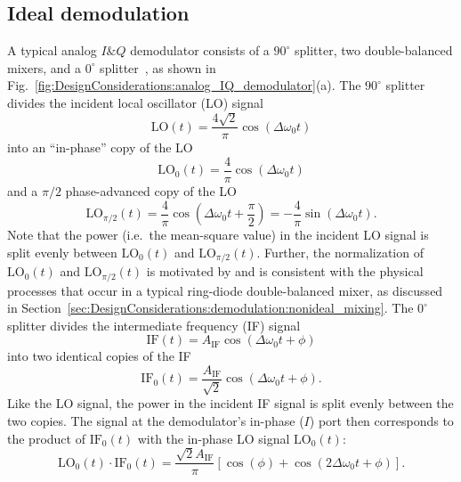 \subsection{Ideal demodulation}
\label{sec:DesignConsiderations:demodulation:ideal}
A typical analog $I\&Q$ demodulator consists of
a $90^{\circ}$ splitter,
two double-balanced mixers, and
a $0^{\circ}$ splitter~\cite{minicircuits_modulators}, as shown in
Fig.~\ref{fig:DesignConsiderations:analog_IQ_demodulator}(a).
The $90^{\circ}$ splitter divides the incident local oscillator (LO) signal
\begin{equation}
  \text{LO}(t) = \frac{4 \sqrt{2}}{\pi} \cos(\Delta\omega_0 t)
\end{equation}
into an ``in-phase'' copy of the LO
\begin{equation}
  \text{LO}_0(t)
  =
  \frac{4}{\pi} \cos(\Delta\omega_0 t)
\end{equation}
and a $\pi / 2$ phase-advanced copy of the LO
\begin{equation}
  \text{LO}_{\pi / 2}(t)
  =
  \frac{4}{\pi} \cos\left( \Delta\omega_0 t + \frac{\pi}{2} \right)
  =
  -\frac{4}{\pi} \sin(\Delta\omega_0 t).
\end{equation}
Note that the power (i.e.\ the mean-square value) in the incident LO signal
is split evenly between $\text{LO}_0(t)$ and $\text{LO}_{\pi / 2}(t)$.
Further, the normalization of $\text{LO}_0(t)$ and $\text{LO}_{\pi / 2}(t)$
is motivated by and is consistent with the physical processes
that occur in a typical ring-diode double-balanced mixer, as discussed in
Section~\ref{sec:DesignConsiderations:demodulation:nonideal_mixing}.
The $0^{\circ}$ splitter divides the intermediate frequency (IF) signal
\begin{equation}
  \text{IF}(t) = A_{\text{IF}} \cos(\Delta\omega_0 t + \phi)
  \label{eq:DesignConsiderations:IF_perfect_sinusoid}
\end{equation}
into two identical copies of the IF
\begin{equation}
  \text{IF}_0(t)
  =
  \frac{A_{\text{IF}}}{\sqrt{2}} \cos(\Delta\omega_0 t + \phi).
  \label{eq:DesignConsiderations:split_IF}
\end{equation}
Like the LO signal, the power in the incident IF signal
is split evenly between the two copies.
The signal at the demodulator's in-phase ($I$) port
then corresponds to the product of
$\text{IF}_0(t)$ with the in-phase LO signal $\text{LO}_0(t)$:
\begin{equation}
  \text{LO}_0(t) \cdot \text{IF}_0(t)
  =
  \frac{\sqrt{2} A_{\text{IF}}}{\pi}
  \left[
    \cos(\phi) + \cos(2 \Delta\omega_0 t + \phi)
  \right].
\end{equation}
